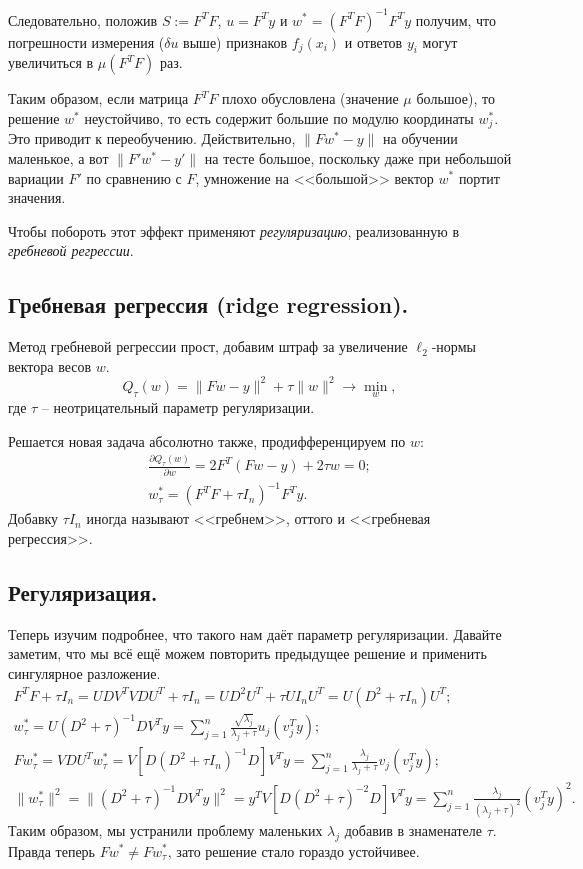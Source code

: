 Следовательно, положив $S := F^T F$, $u = F^T y$ и $w^* = (F^T F)^{-1} F^T y$ получим, что погрешности измерения ($\delta u$ выше) признаков $f_j(x_i)$ и ответов $y_i$ могут увеличиться в $\mu(F^T F)$ раз.

Таким образом, если матрица $F^TF$ плохо обусловлена (значение $\mu$ большое), то решение $w^*$ неустойчиво, то есть содержит большие по модулю координаты $w_j^*$. Это приводит к переобучению. Действительно, $\|Fw^* - y\|$ на обучении маленькое, а вот $\|F'w^* - y'\|$ на тесте большое, поскольку даже при небольшой вариации $F'$ по сравнению с $F$, умножение на <<большой>> вектор $w^*$ портит значения.

Чтобы побороть этот эффект применяют \textit{регуляризацию}, реализованную в \textit{гребневой регрессии}.

\subsection*{Гребневая регрессия (ridge regression).}
Метод гребневой регрессии прост, добавим штраф за увеличение $\ell_2$-нормы вектора весов $w$.
$$Q_\tau(w) = \|Fw - y\|^2 + \tau \|w\|^2 \to \min_w,$$
где $\tau$ -- неотрицательный параметр регуляризации.

Решается новая задача абсолютно также, продифференцируем по $w$:
\begin{gather*}
    \frac{\partial Q_\tau(w)}{\partial w} = 2 F^T (Fw - y) + 2\tau w = 0; \\
    w_\tau^* = (F^TF + \tau I_n)^{-1} F^Ty.
\end{gather*}
Добавку $\tau I_n$ иногда называют <<гребнем>>, оттого и <<гребневая регрессия>>.

\subsection*{Регуляризация.}
Теперь изучим подробнее, что такого нам даёт параметр регуляризации.
Давайте заметим, что мы всё ещё можем повторить предыдущее решение и применить сингулярное разложение.
\begin{gather*}
    F^TF + \tau I_n = UDV^TVDU^T + \tau I_n = UD^2U^T + \tau UI_nU^T = U(D^2 + \tau I_n)U^T; \\
    w_\tau^* = U(D^2 + \tau)^{-1}DV^Ty = \sum_{j=1}^n \frac{\sqrt{\lambda_j}}{\lambda_j + \tau}u_j(v_j^Ty); \\
    Fw_\tau^* = VDU^Tw_\tau^* = V\left[D(D^2 + \tau I_n)^{-1}D\right]V^Ty = \sum_{j=1}^n \frac{\lambda_j}{\lambda_j + \tau} v_j(v_j^Ty); \\
    \|w_\tau^*\|^2 = \|(D^2 + \tau)^{-1}DV^Ty\|^2 = y^TV\left[D(D^2 + \tau)^{-2}D\right]V^Ty = \sum_{j=1}^n \frac{\lambda_j}{(\lambda_j + \tau)^2}(v_j^Ty)^2.
\end{gather*}
Таким образом, мы устранили проблему маленьких $\lambda_j$ добавив в знаменателе $\tau$. Правда теперь $Fw^* \not= Fw_\tau^*$, зато решение стало гораздо устойчивее.

